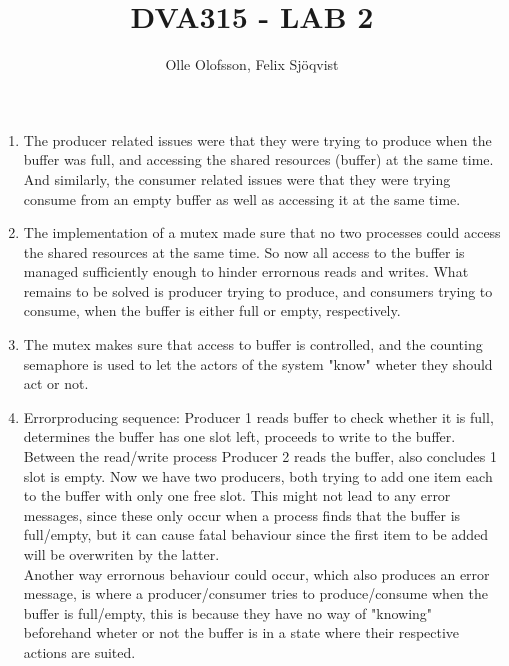 \documentclass[12pt]{article}
\title{DVA315 - LAB 2}
\author{Olle Olofsson, Felix Sjöqvist}
\begin{document}
\maketitle

\begin{enumerate}
    \item The producer related issues were that they were trying to produce when the buffer was full, and accessing the shared resources (buffer) at the same time. And similarly, the consumer related issues were that they were trying consume from an empty buffer as well as accessing it at the same time.
    \item The implementation of a mutex made sure that no two processes could access the shared resources at the same time. So now all access to the buffer is managed sufficiently enough to hinder errornous reads and writes. What remains to be solved is producer trying to produce, and consumers trying to consume, when the buffer is either full or empty, respectively.
    \item The mutex makes sure that access to buffer is controlled, and the counting semaphore is used to let the actors of the system "know" wheter they should act or not.
    \item Errorproducing sequence: Producer 1 reads buffer to check whether it is full, determines the buffer has one slot left, proceeds to write to the buffer. Between the read/write process Producer 2 reads the buffer, also concludes 1 slot is empty. Now we have two producers, both trying to add one item each to the buffer with only one free slot. This might not lead to any error messages, since these only occur when a process finds that the buffer is full/empty, but it can cause fatal behaviour since the first item to be added will be overwriten by the latter.\\Another way errornous behaviour could occur, which also produces an error message, is where a producer/consumer tries to produce/consume when the buffer is full/empty, this is because they have no way of "knowing" beforehand wheter or not the buffer is in a state where their respective actions are suited.
\end{enumerate}
\end{document}
